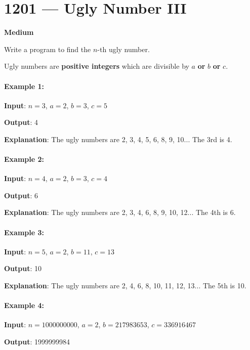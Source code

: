 \section{1201 --- Ugly Number III}
\textbf{Medium}

Write a program to find the $n$-th ugly number.

Ugly numbers are \textbf{positive integers} which are divisible by $a$ \textbf{or} $b$ \textbf{or} $c$.

 
\paragraph{Example 1:}

\begin{flushleft}
\textbf{Input}: $ n = 3 $, $ a = 2 $, $ b = 3 $, $ c = 5 $

\textbf{Output}: 4

\textbf{Explanation}: The ugly numbers are 2, 3, 4, 5, 6, 8, 9, 10... The 3rd is 4.
\end{flushleft}

\paragraph{Example 2:}

\begin{flushleft}
\textbf{Input}: $ n = 4 $, $ a = 2 $, $ b = 3 $, $ c = 4 $

\textbf{Output}: 6

\textbf{Explanation}: The ugly numbers are 2, 3, 4, 6, 8, 9, 10, 12... The 4th is 6.
\end{flushleft}

\paragraph{Example 3:}

\begin{flushleft}
\textbf{Input}: $  n = 5 $, $ a = 2 $, $ b = 11 $, $ c = 13 $

\textbf{Output}: 10

\textbf{Explanation}: The ugly numbers are 2, 4, 6, 8, 10, 11, 12, 13... The 5th is 10.
\end{flushleft}

\paragraph{Example 4:}

\begin{flushleft}
\textbf{Input}: $ n = 1000000000 $, $ a = 2 $, $ b = 217983653 $, $ c = 336916467 $

\textbf{Output}: 1999999984
\end{flushleft}

